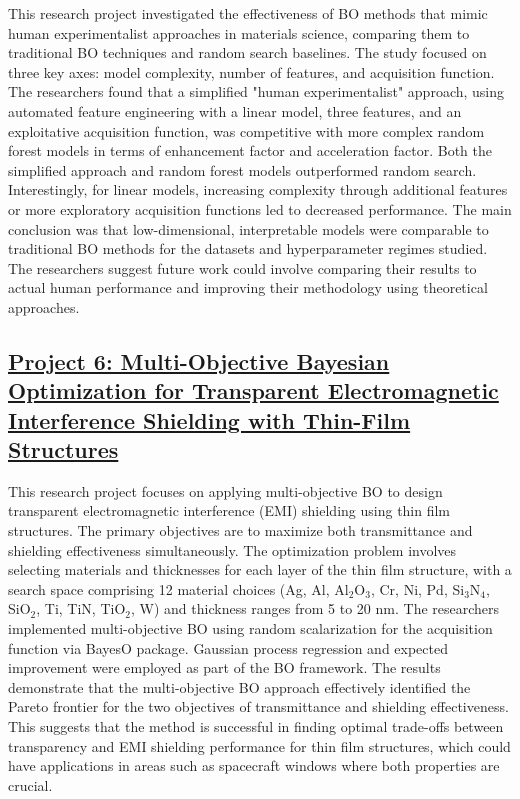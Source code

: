 This research project investigated the effectiveness of BO methods that mimic human experimentalist approaches in materials science\cite{muckley2023interpretable}, comparing them to traditional BO techniques and random search baselines\cite{snoek2012practical,bergstra2012random}. The study focused on three key axes: model complexity, number of features, and acquisition function. The researchers found that a simplified "human experimentalist" approach, using automated feature engineering with a linear model, three features, and an exploitative acquisition function, was competitive with more complex random forest models in terms of enhancement factor and acceleration factor. Both the simplified approach and random forest models outperformed random search. Interestingly, for linear models, increasing complexity through additional features or more exploratory acquisition functions led to decreased performance. The main conclusion was that low-dimensional, interpretable models were comparable to traditional BO methods for the datasets and hyperparameter regimes studied. The researchers suggest future work could involve comparing their results to actual human performance and improving their methodology using theoretical approaches.
 \subsection*{\href{https://www.youtube.com/watch?v=RgEbcWIBDn8}{Project 6: Multi-Objective Bayesian Optimization for Transparent Electromagnetic Interference Shielding with Thin-Film Structures}}

This research project focuses on applying multi-objective BO to design transparent electromagnetic interference (EMI) shielding using thin film structures\cite{li2022bayesian}. The primary objectives are to maximize both transmittance and shielding effectiveness simultaneously. The optimization problem involves selecting materials and thicknesses for each layer of the thin film structure, with a search space comprising 12 material choices (Ag, Al, Al$_2$O$_3$, Cr, Ni, Pd, Si$_3$N$_4$, SiO$_2$, Ti, TiN, TiO$_2$, W) and thickness ranges from 5 to 20 nm. The researchers implemented multi-objective BO using random scalarization for the acquisition function via BayesO package\cite{kim2023bayeso}. Gaussian process regression and expected improvement were employed as part of the BO framework. The results demonstrate that the multi-objective BO approach effectively identified the Pareto frontier for the two objectives of transmittance and shielding effectiveness. This suggests that the method is successful in finding optimal trade-offs between transparency and EMI shielding performance for thin film structures, which could have applications in areas such as spacecraft windows where both properties are crucial.

